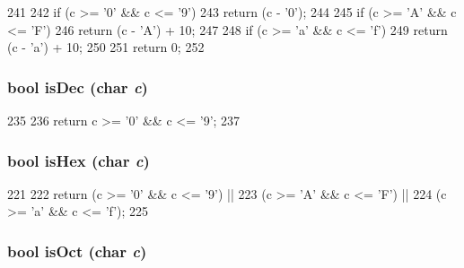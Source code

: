 \begin{DoxyCode}
241 {
242   if (c >= '0' && c <= '9')
243     return (c - '0');
244 
245   if (c >= 'A' && c <= 'F')
246     return (c - 'A') + 10;
247 
248   if (c >= 'a' && c <= 'f')
249     return (c - 'a') + 10;
250 
251   return 0;
252 }
\end{DoxyCode}
\hypertarget{intmath_8hh_a8b463f338b8712a8914d9f8f6cf45db8}{
\subsubsection[{isDec}]{\setlength{\rightskip}{0pt plus 5cm}bool isDec (char {\em c})}}
\label{intmath_8hh_a8b463f338b8712a8914d9f8f6cf45db8}



\begin{DoxyCode}
235 {
236     return c >= '0' && c <= '9';
237 }
\end{DoxyCode}
\hypertarget{intmath_8hh_ab7ca9ee391118aafe6f3cf7df4fa5de3}{
\subsubsection[{isHex}]{\setlength{\rightskip}{0pt plus 5cm}bool isHex (char {\em c})}}
\label{intmath_8hh_ab7ca9ee391118aafe6f3cf7df4fa5de3}



\begin{DoxyCode}
221 {
222     return (c >= '0' && c <= '9') ||
223         (c >= 'A' && c <= 'F') ||
224         (c >= 'a' && c <= 'f');
225 }
\end{DoxyCode}
\hypertarget{intmath_8hh_a6c0f35ebd0c531065480e2de41c0adff}{
\subsubsection[{isOct}]{\setlength{\rightskip}{0pt plus 5cm}bool isOct (char {\em c})}}
\label{intmath_8hh_a6c0f35ebd0c531065480e2de41c0adff}



